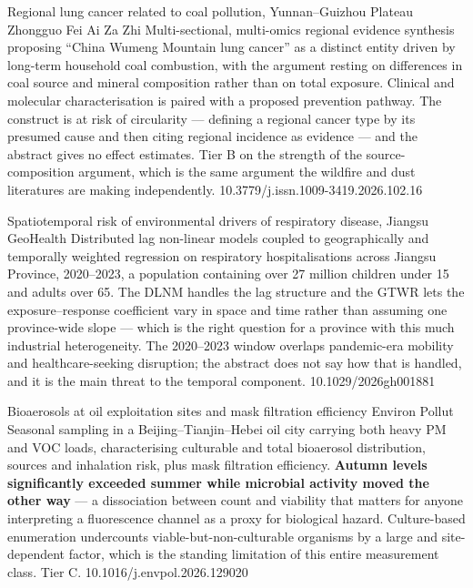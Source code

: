 \documentclass[10pt]{article}
\begin{document}
\clearpage


{Regional lung cancer related to coal pollution, Yunnan--Guizhou Plateau}
{Zhongguo Fei Ai Za Zhi}
{Multi-sectional, multi-omics regional evidence synthesis proposing ``China Wumeng
Mountain lung cancer'' as a distinct entity driven by long-term household coal
combustion, with the argument resting on differences in coal source and mineral
composition rather than on total exposure. Clinical and molecular characterisation is
paired with a proposed prevention pathway. The construct is at risk of circularity ---
defining a regional cancer type by its presumed cause and then citing regional
incidence as evidence --- and the abstract gives no effect estimates. Tier B on the
strength of the source-composition argument, which is the same argument the wildfire and
dust literatures are making independently.}
{10.3779/j.issn.1009-3419.2026.102.16}

{Spatiotemporal risk of environmental drivers of respiratory disease, Jiangsu}
{GeoHealth}
{Distributed lag non-linear models coupled to geographically and temporally weighted
regression on respiratory hospitalisations across Jiangsu Province, 2020--2023, a
population containing over 27 million children under 15 and adults over 65. The DLNM
handles the lag structure and the GTWR lets the exposure--response coefficient vary in
space and time rather than assuming one province-wide slope --- which is the right
question for a province with this much industrial heterogeneity. The 2020--2023 window
overlaps pandemic-era mobility and healthcare-seeking disruption; the abstract does not
say how that is handled, and it is the main threat to the temporal component.}
{10.1029/2026gh001881}


{Bioaerosols at oil exploitation sites and mask filtration efficiency}
{Environ Pollut}
{Seasonal sampling in a Beijing--Tianjin--Hebei oil city carrying both heavy PM and VOC
loads, characterising culturable and total bioaerosol distribution, sources and
inhalation risk, plus mask filtration efficiency. \textbf{Autumn levels significantly
exceeded summer while microbial activity moved the other way} --- a dissociation between
count and viability that matters for anyone interpreting a fluorescence channel as a
proxy for biological hazard. Culture-based enumeration undercounts viable-but-non-culturable
organisms by a large and site-dependent factor, which is the standing limitation of this
entire measurement class. Tier C.}
{10.1016/j.envpol.2026.129020}
\end{document}

